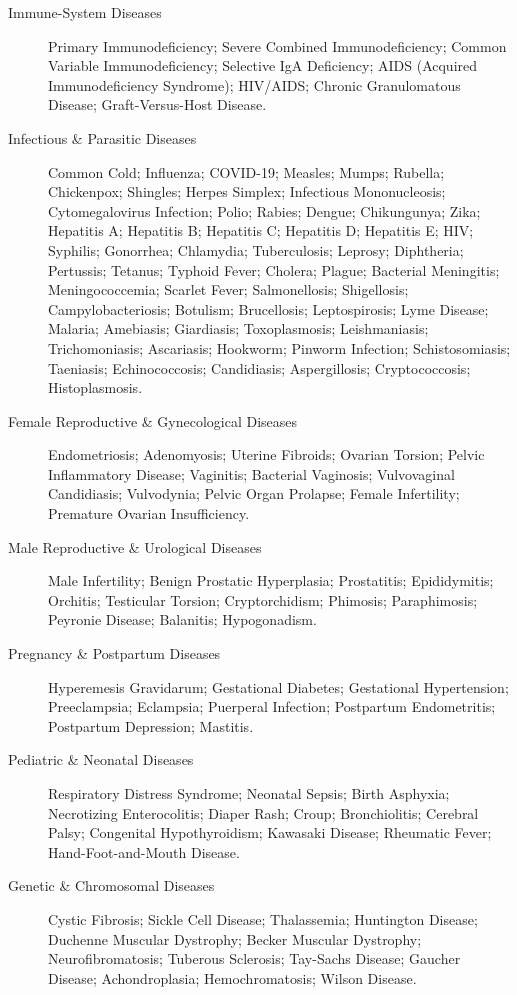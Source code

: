 \begin{description}
%
\item[Immune-System Diseases] Primary Immunodeficiency; Severe Combined Immunodeficiency; Common Variable Immunodeficiency; Selective IgA Deficiency; AIDS (Acquired Immunodeficiency Syndrome); HIV/AIDS; Chronic Granulomatous Disease; Graft-Versus-Host Disease.
%
\item[Infectious \& Parasitic Diseases] Common Cold; Influenza; COVID-19; Measles; Mumps; Rubella; Chickenpox; Shingles; Herpes Simplex; Infectious Mononucleosis; Cytomegalovirus Infection; Polio; Rabies; Dengue; Chikungunya; Zika; Hepatitis A; Hepatitis B; Hepatitis C; Hepatitis D; Hepatitis E; HIV; Syphilis; Gonorrhea; Chlamydia; Tuberculosis; Leprosy; Diphtheria; Pertussis; Tetanus; Typhoid Fever; Cholera; Plague; Bacterial Meningitis; Meningococcemia; Scarlet Fever; Salmonellosis; Shigellosis; Campylobacteriosis; Botulism; Brucellosis; Leptospirosis; Lyme Disease; Malaria; Amebiasis; Giardiasis; Toxoplasmosis; Leishmaniasis; Trichomoniasis; Ascariasis; Hookworm; Pinworm Infection; Schistosomiasis; Taeniasis; Echinococcosis; Candidiasis; Aspergillosis; Cryptococcosis; Histoplasmosis.
%
\item[Female Reproductive \& Gynecological Diseases] Endometriosis; Adenomyosis; Uterine Fibroids; Ovarian Torsion; Pelvic Inflammatory Disease; Vaginitis; Bacterial Vaginosis; Vulvovaginal Candidiasis; Vulvodynia; Pelvic Organ Prolapse; Female Infertility; Premature Ovarian Insufficiency.
%
\item[Male Reproductive \& Urological Diseases] Male Infertility; Benign Prostatic Hyperplasia; Prostatitis; Epididymitis; Orchitis; Testicular Torsion; Cryptorchidism; Phimosis; Paraphimosis; Peyronie Disease; Balanitis; Hypogonadism.
%
\item[Pregnancy \& Postpartum Diseases] Hyperemesis Gravidarum; Gestational Diabetes; Gestational Hypertension; Preeclampsia; Eclampsia; Puerperal Infection; Postpartum Endometritis; Postpartum Depression; Mastitis.
%
\item[Pediatric \& Neonatal Diseases] Respiratory Distress Syndrome; Neonatal Sepsis; Birth Asphyxia; Necrotizing Enterocolitis; Diaper Rash; Croup; Bronchiolitis; Cerebral Palsy; Congenital Hypothyroidism; Kawasaki Disease; Rheumatic Fever; Hand-Foot-and-Mouth Disease.
%
\item[Genetic \& Chromosomal Diseases] Cystic Fibrosis; Sickle Cell Disease; Thalassemia; Huntington Disease; Duchenne Muscular Dystrophy; Becker Muscular Dystrophy; Neurofibromatosis; Tuberous Sclerosis; Tay-Sachs Disease; Gaucher Disease; Achondroplasia; Hemochromatosis; Wilson Disease.


\end{description}
